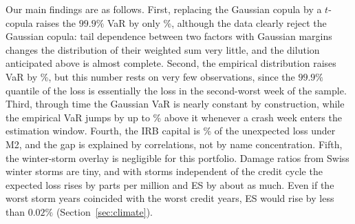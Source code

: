 Our main findings are as follows. First, replacing the Gaussian copula by a $t$-copula raises the $99.9\%$ VaR by only \%, although the data clearly reject the Gaussian copula: tail dependence between two factors with Gaussian margins changes the distribution of their weighted sum very little, and the dilution anticipated above is almost complete. Second, the empirical distribution raises VaR by \%, but this number rests on very few observations, since the $99.9\%$ quantile of the loss is essentially the loss in the second-worst week of the sample. Third, through time the Gaussian VaR is nearly constant by construction, while the empirical VaR jumps by up to \% above it whenever a crash week enters the estimation window. Fourth, the IRB capital is \% of the unexpected loss under M2, and the gap is explained by correlations, not by name concentration. Fifth, the winter-storm overlay is negligible for this portfolio. Damage ratios from Swiss winter storms are tiny, and with storms independent of the credit cycle the expected loss rises by  parts per million and ES by about as much. Even if the worst storm years coincided with the worst credit years, ES would rise by less than $0.02\%$ (Section~\ref{sec:climate}).

